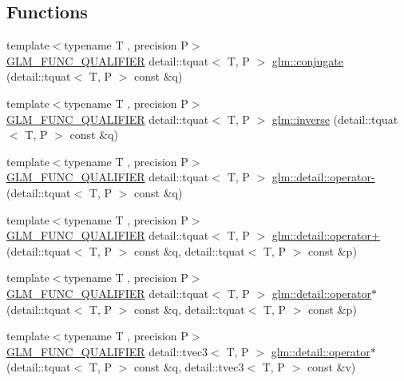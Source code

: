\subsection*{Functions}
\begin{DoxyCompactItemize}
\item 
{\footnotesize template$<$typename T , precision P$>$ }\\\hyperlink{setup_8hpp_a33fdea6f91c5f834105f7415e2a64407}{G\+L\+M\+\_\+\+F\+U\+N\+C\+\_\+\+Q\+U\+A\+L\+I\+F\+I\+ER} detail\+::tquat$<$ T, P $>$ \hyperlink{group__gtc__quaternion_gaf78006c47276b151777fc194cf11a688}{glm\+::conjugate} (detail\+::tquat$<$ T, P $>$ const \&q)
\item 
{\footnotesize template$<$typename T , precision P$>$ }\\\hyperlink{setup_8hpp_a33fdea6f91c5f834105f7415e2a64407}{G\+L\+M\+\_\+\+F\+U\+N\+C\+\_\+\+Q\+U\+A\+L\+I\+F\+I\+ER} detail\+::tquat$<$ T, P $>$ \hyperlink{group__gtc__quaternion_ga6613ef61cb980a18f19ece5f421564da}{glm\+::inverse} (detail\+::tquat$<$ T, P $>$ const \&q)
\item 
{\footnotesize template$<$typename T , precision P$>$ }\\\hyperlink{setup_8hpp_a33fdea6f91c5f834105f7415e2a64407}{G\+L\+M\+\_\+\+F\+U\+N\+C\+\_\+\+Q\+U\+A\+L\+I\+F\+I\+ER} detail\+::tquat$<$ T, P $>$ \hyperlink{namespaceglm_1_1detail_aaeaeb4c634f2abcfe3c524db5e38d863}{glm\+::detail\+::operator-\/} (detail\+::tquat$<$ T, P $>$ const \&q)
\item 
{\footnotesize template$<$typename T , precision P$>$ }\\\hyperlink{setup_8hpp_a33fdea6f91c5f834105f7415e2a64407}{G\+L\+M\+\_\+\+F\+U\+N\+C\+\_\+\+Q\+U\+A\+L\+I\+F\+I\+ER} detail\+::tquat$<$ T, P $>$ \hyperlink{namespaceglm_1_1detail_a80b78b61eccf89d7d4f0e5dbd7f93aec}{glm\+::detail\+::operator+} (detail\+::tquat$<$ T, P $>$ const \&q, detail\+::tquat$<$ T, P $>$ const \&p)
\item 
{\footnotesize template$<$typename T , precision P$>$ }\\\hyperlink{setup_8hpp_a33fdea6f91c5f834105f7415e2a64407}{G\+L\+M\+\_\+\+F\+U\+N\+C\+\_\+\+Q\+U\+A\+L\+I\+F\+I\+ER} detail\+::tquat$<$ T, P $>$ \hyperlink{namespaceglm_1_1detail_ac01bc808c06043b6b7f321b39775a64c}{glm\+::detail\+::operator$\ast$} (detail\+::tquat$<$ T, P $>$ const \&q, detail\+::tquat$<$ T, P $>$ const \&p)
\item 
{\footnotesize template$<$typename T , precision P$>$ }\\\hyperlink{setup_8hpp_a33fdea6f91c5f834105f7415e2a64407}{G\+L\+M\+\_\+\+F\+U\+N\+C\+\_\+\+Q\+U\+A\+L\+I\+F\+I\+ER} detail\+::tvec3$<$ T, P $>$ \hyperlink{namespaceglm_1_1detail_a217e4015819bcaf1cc8f30c99698b102}{glm\+::detail\+::operator$\ast$} (detail\+::tquat$<$ T, P $>$ const \&q, detail\+::tvec3$<$ T, P $>$ const \&v)

\end{DoxyCompactItemize}
